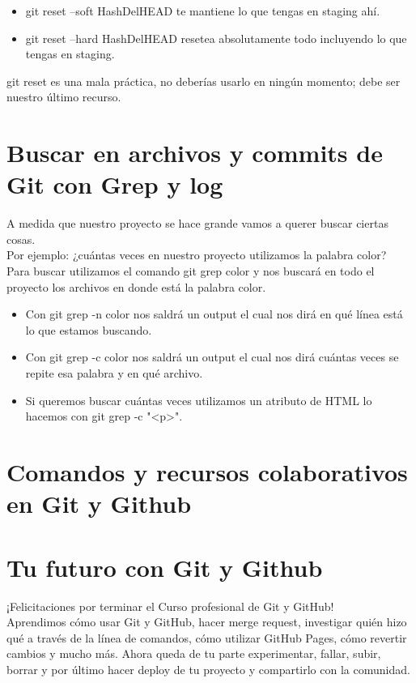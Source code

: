 \documentclass{article}
\begin{document}
\begin{itemize}
  \item git reset --soft HashDelHEAD te mantiene lo que tengas en staging ahí.
  \item git reset --hard HashDelHEAD resetea absolutamente todo incluyendo lo
    que tengas en staging.
\end{itemize}

git reset es una mala práctica, no deberías usarlo en ningún momento; debe ser
nuestro último recurso.


\section{Buscar en archivos y commits de Git con Grep y log}%
A medida que nuestro proyecto se hace grande vamos a querer buscar ciertas
cosas.\\

Por ejemplo: ¿cuántas veces en nuestro proyecto utilizamos la palabra color?\\

Para buscar utilizamos el comando git grep color y nos buscará en todo el
proyecto los archivos en donde está la palabra color.

\begin{itemize}
  \item Con git grep -n color nos saldrá un output el cual nos dirá en qué
    línea está lo que estamos buscando.
  \item Con git grep -c color nos saldrá un output el cual nos dirá cuántas
    veces se repite esa palabra y en qué archivo.
  \item Si queremos buscar cuántas veces utilizamos un atributo de HTML lo
    hacemos con git grep -c "<p>".
\end{itemize}


\section{Comandos y recursos colaborativos en Git y Github}%


\section{Tu futuro con Git y Github}%
¡Felicitaciones por terminar el Curso profesional de Git y GitHub!\\

Aprendimos cómo usar Git y GitHub, hacer merge request, investigar quién hizo
qué a través de la línea de comandos, cómo utilizar GitHub Pages, cómo revertir
cambios y mucho más. Ahora queda de tu parte experimentar, fallar, subir,
borrar y por último hacer deploy de tu proyecto y compartirlo con la
comunidad.\\
\end{document}
